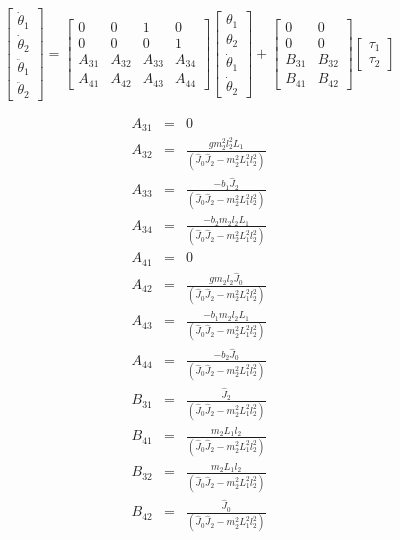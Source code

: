 \begin{equation}
\begin{bmatrix}
\dot{\theta}_1 \\ 
\dot{\theta}_2 \\ 
\ddot{\theta}_1 \\ 
\ddot{\theta}_2
\end{bmatrix}
=
\begin{bmatrix}
0 & 0 & 1 & 0 \\ 
0 & 0 & 0 & 1 \\ 
A_{31} & A_{32} & A_{33} & A_{34} \\ 
A_{41} & A_{42} & A_{43} & A_{44}
\end{bmatrix}
\begin{bmatrix}
\theta_1 \\ 
\theta_2 \\ 
\dot{\theta}_1 \\
\dot{\theta}_2
\end{bmatrix}
+
\begin{bmatrix}
0 & 0 \\ 
0 & 0 \\ 
B_{31} & B_{32} \\ 
B_{41} & B_{42}
\end{bmatrix}
\begin{bmatrix}
\tau_1 \\ 
\tau_2
\end{bmatrix}
\end{equation}

\begin{eqnarray}
A_{31} &=& 0	\nonumber \\
A_{32} &=& \frac{gm^2_2l^2_2L_1}{(\hat{J}_0\hat{J}_2-m^2_2L^2_1l^2_2)}	\nonumber \\
A_{33} &=& \frac{-b_1\hat{J}_2}{(\hat{J}_0\hat{J}_2-m^2_2L^2_1l^2_2)}	\nonumber \\
A_{34} &=& \frac{-b_2m_2l_2L_1}{(\hat{J}_0\hat{J}_2-m^2_2L^2_1l^2_2)}	\nonumber \\
A_{41} &=& 0	\nonumber \\
A_{42} &=& \frac{gm_2l_2\hat{J}_0}{(\hat{J}_0\hat{J}_2-m^2_2L^2_1l^2_2)}	\nonumber \\
A_{43} &=& \frac{-b_1m_2l_2L_1}{(\hat{J}_0\hat{J}_2-m^2_2L^2_1l^2_2)}	\nonumber \\
A_{44} &=& \frac{-b_2\hat{J}_0}{(\hat{J}_0\hat{J}_2-m^2_2L^2_1l^2_2)}	\nonumber \\
B_{31} &=& \frac{\hat{J}_2}{(\hat{J}_0\hat{J}_2-m^2_2L^2_1l^2_2)}	\nonumber \\
B_{41} &=& \frac{m_2L_1l_2}{(\hat{J}_0\hat{J}_2-m^2_2L^2_1l^2_2)}	\nonumber \\
B_{32} &=& \frac{m_2L_1l_2}{(\hat{J}_0\hat{J}_2-m^2_2L^2_1l^2_2)}	\nonumber \\
B_{42} &=& \frac{\hat{J}_0}{(\hat{J}_0\hat{J}_2-m^2_2L^2_1l^2_2)}	\nonumber \\
\end{eqnarray}

